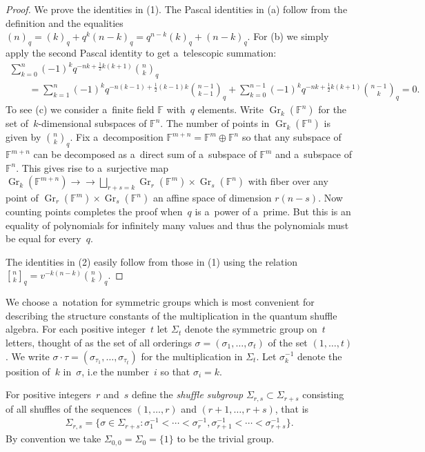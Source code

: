 \documentclass[pdftex]{sigma}
\newcommand{\onto}{\to\!\!\!\!\!\to}
\numberwithin{equation}{section}
\begin{document}
\begin{proof}
We prove the identities in (1).
The Pascal identities in (a) follow from the def\/inition and the equalities
$(n)_q=(k)_q+q^k(n-k)_q=q^{n-k}(k)_q+(n-k)_q$.
For (b) we simply apply the second Pascal identity to get a~telescopic summation:
\begin{gather*}
\sum\limits_{k=0}^n (-1)^k q^{-nk+\frac{1}{2} k(k+1)}{n\choose k}_q
\\
\qquad
=\sum\limits_{k=1}^n (-1)^k
q^{-n(k-1)+\frac{1}{2}(k-1)k}{n-1\choose k-1}_q+\sum\limits_{k=0}^{n-1} (-1)^k q^{-nk+\frac{1}{2} k(k+1)}{n-1\choose
k}_q=0.
\end{gather*}
To see (c) we consider a~f\/inite f\/ield $\mathbb{F}$ with~$q$ elements.
Write $\operatorname{Gr}_k(\mathbb{F}^n)$ for the set of~$k$-dimensional subspaces of $\mathbb{F}^n$.
The number of points in $\operatorname{Gr}_k(\mathbb{F}^n)$ is given by ${n\choose k}_q$.
Fix a~decomposition $\mathbb{F}^{m+n}=\mathbb{F}^m\oplus\mathbb{F}^n$ so that any subspace of $\mathbb{F}^{m+n}$ can be
decomposed as a~direct sum of a~subspace of $\mathbb{F}^m$ and a~subspace of $\mathbb{F}^n$.
This gives rise to a~surjective map $\operatorname{Gr}_k(\mathbb{F}^{m+n})\onto \bigsqcup\limits_{r+s=k}\operatorname{Gr}_r(\mathbb{F}^m)\times\operatorname{Gr}_s(\mathbb{F}^n)$ with f\/iber over any point
of $\operatorname{Gr}_r(\mathbb{F}^m)\times\operatorname{Gr}_s(\mathbb{F}^n)$ an af\/f\/ine space of dimension $r(n-s)$.
Now counting points completes the proof when~$q$ is a~power of a~prime.
But this is an equality of polynomials for inf\/initely many values and thus the polynomials must be equal for every~$q$.

The identities in (2) easily follow from those in (1) using the relation ${n\brack k}_q=v^{-k(n-k)}{n\choose k}_q$.
\end{proof}

We choose a~notation for symmetric groups which is most convenient for describing the structure constants of the
multiplication in the quantum shuf\/f\/le algebra.
For each positive integer~$t$ let $\Sigma_t$ denote the symmetric group on~$t$ letters, thought of as the set of all
orderings $\sigma=(\sigma_1,\ldots,\sigma_t)$ of the set $(1,\ldots,t)$.
We write $\sigma\cdot\tau=(\sigma_{\tau_1},\ldots,\sigma_{\tau_t})$ for the multiplication in $\Sigma_t$.
Let $\sigma^{-1}_k$ denote the position of~$k$ in~$\sigma$, i.e the number~$i$ so that $\sigma_i=k$.

For positive integers~$r$ and~$s$ def\/ine the \emph{shuffle subgroup} $\Sigma_{r,s}\subset\Sigma_{r+s}$ consisting of all
shuf\/f\/les of the sequences $(1,\ldots,r)$ and $(r+1,\ldots,r+s)$, that is
\begin{gather*}
\Sigma_{r,s}=\big\{\sigma\in\Sigma_{r+s}: \sigma^{-1}_1<\cdots<\sigma^{-1}_r, \sigma^{-1}_{r+1}<\cdots<\sigma^{-1}_{r+s}\big\}.
\end{gather*}
By convention we take $\Sigma_{0,0}=\Sigma_0=\{1\}$ to be the trivial group.
\end{document}
